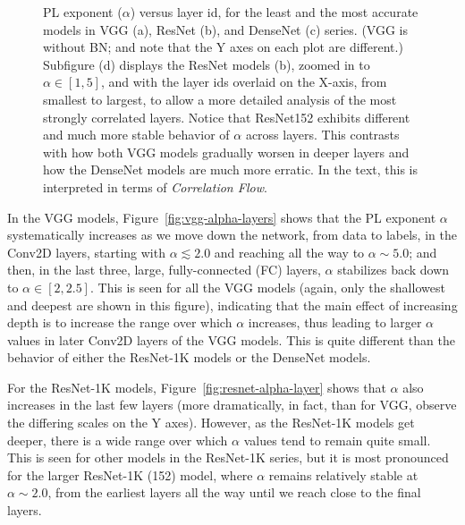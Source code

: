 \begin{figure}[t]
{}    
    \caption{PL exponent ($\alpha$) versus layer id, for the least and the most accurate models in VGG (a), ResNet (b), and DenseNet (c) series. 
             (VGG is without BN; and note that the Y axes on each plot are different.)  
             Subfigure (d) displays the ResNet models (b), zoomed in to $\alpha\in[1,5]$, and with the layer ids overlaid on the X-axis, from smallest to largest, to
             allow a more detailed analysis of the most strongly correlated layers.
             Notice that ResNet152 exhibits different and much more stable behavior of $\alpha$ across layers.
             This contrasts with how both VGG models gradually worsen in deeper layers and how the DenseNet models are much more erratic.  
             In the text, this is interpreted in terms of \emph{Correlation Flow}.
            }
    \label{fig:3models-alpha-layers}
\end{figure}

In the VGG models, Figure~\ref{fig:vgg-alpha-layers} shows that the PL exponent $\alpha$ systematically increases as we move down the network, from data to labels, in the Conv2D layers, starting with $\alpha\lesssim 2.0$ and reaching all the way to $\alpha\sim 5.0$; and then, in the last three, large, fully-connected (FC) layers, $\alpha$ stabilizes back down to $\alpha\in[2,2.5]$.
This is seen for all the VGG models (again, only the shallowest and deepest are shown in this figure), indicating that the main effect of increasing depth is to increase the range over which $\alpha$ increases, thus leading to larger $\alpha$ values in later Conv2D layers of the VGG models.
This is quite different than the behavior of either the ResNet-1K models or the DenseNet models.

For the ResNet-1K models, Figure~\ref{fig:resnet-alpha-layer} shows that $\alpha$ also increases in the last few layers (more dramatically, in fact, than for VGG, observe the differing scales on the Y axes).
However, as the ResNet-1K models get deeper, there is a wide range over which $\alpha$ values tend to remain quite small.
This is seen for other models in the ResNet-1K series, but it is most pronounced for the larger ResNet-1K (152) model, where $\alpha$ remains relatively stable at $\alpha\sim 2.0$, from the earliest layers all the way until we reach close to the final layers.  

